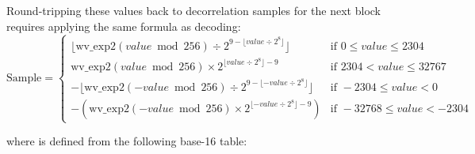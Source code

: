 Round-tripping these values back to decorrelation samples
for the next block requires applying the same formula
as decoding:
\begin{equation*}
\text{Sample} =
\begin{cases}
\lfloor \text{wv\_exp2}(value \bmod{256}) \div 2 ^ {9 - \lfloor value \div 2 ^ 8 \rfloor} \rfloor & \text{if } 0 \leq value \leq 2304 \\
\text{wv\_exp2}(value \bmod{256}) \times 2 ^ {\lfloor value \div 2 ^ 8 \rfloor - 9} & \text{if } 2304 < value \leq 32767 \\
-\lfloor \text{wv\_exp2}(-value \bmod{256}) \div 2 ^ {9 - \lfloor -value \div 2 ^ 8 \rfloor} \rfloor & \text{if } -2304 \leq value < 0 \\
-(\text{wv\_exp2}(-value \bmod{256}) \times 2 ^ {\lfloor -value \div 2 ^ 8 \rfloor - 9}) & \text{if } -32768 \leq value < -2304
\end{cases}
\end{equation*}
\par
\noindent
where  is defined from the following base-16 table:
\par
\noindent
